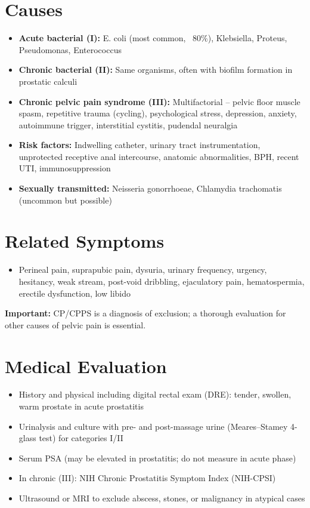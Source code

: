 \section*{Causes}
\begin{itemize}
  \item \textbf{Acute bacterial (I):} E. coli (most common, ~80\%), Klebsiella, Proteus, Pseudomonas, Enterococcus
  \item \textbf{Chronic bacterial (II):} Same organisms, often with biofilm formation in prostatic calculi
  \item \textbf{Chronic pelvic pain syndrome (III):} Multifactorial -- pelvic floor muscle spasm, repetitive trauma (cycling), psychological stress, depression, anxiety, autoimmune trigger, interstitial cystitis, pudendal neuralgia
  \item \textbf{Risk factors:} Indwelling catheter, urinary tract instrumentation, unprotected receptive anal intercourse, anatomic abnormalities, BPH, recent UTI, immunosuppression
  \item \textbf{Sexually transmitted:} Neisseria gonorrhoeae, Chlamydia trachomatis (uncommon but possible)
\end{itemize}

\section*{Related Symptoms}
\begin{itemize}
  \item Perineal pain, suprapubic pain, dysuria, urinary frequency, urgency, hesitancy, weak stream, post-void dribbling, ejaculatory pain, hematospermia, erectile dysfunction, low libido
\end{itemize}
\textbf{Important:} CP/CPPS is a diagnosis of exclusion; a thorough evaluation for other causes of pelvic pain is essential.

\section*{Medical Evaluation}
\begin{itemize}
  \item History and physical including digital rectal exam (DRE): tender, swollen, warm prostate in acute prostatitis
  \item Urinalysis and culture with pre- and post-massage urine (Meares--Stamey 4-glass test) for categories I/II
  \item Serum PSA (may be elevated in prostatitis; do not measure in acute phase)
  \item In chronic (III): NIH Chronic Prostatitis Symptom Index (NIH-CPSI)
  \item Ultrasound or MRI to exclude abscess, stones, or malignancy in atypical cases
\end{itemize}

